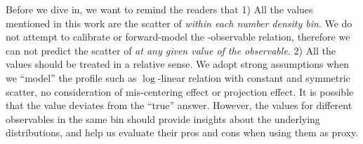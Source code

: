 \documentclass[fleqn,usenatbib,useAMS,english]{mnras}
\begin{document}
    Before we dive in, we want to remind the readers that
    1) All the \sigmh{} values mentioned in this work are the scatter of \mvir{} \emph{within each
    number density bin}. We do not attempt to calibrate or forward-model the \mvir{}-observable
    relation, therefore we can not predict the scatter of \mvir{} \emph{at any given value of
    the observable}.
    2) All the \sigmh{} values should be treated in a relative sense. We adopt strong
    assumptions when we ``model'' the \dsigma{} profile such as $\log$-linear relation with
    constant and symmetric scatter, no consideration of mis-centering effect or projection effect.
    It is possible that the \sigmh{} value deviates from the ``true'' answer.
    However, the \sigmh{} values for different observables in the same bin should provide
    insights about the underlying \mvir{} distributions, and help us evaluate their pros and cons
    when using them as \mvir{} proxy.
\end{document}
